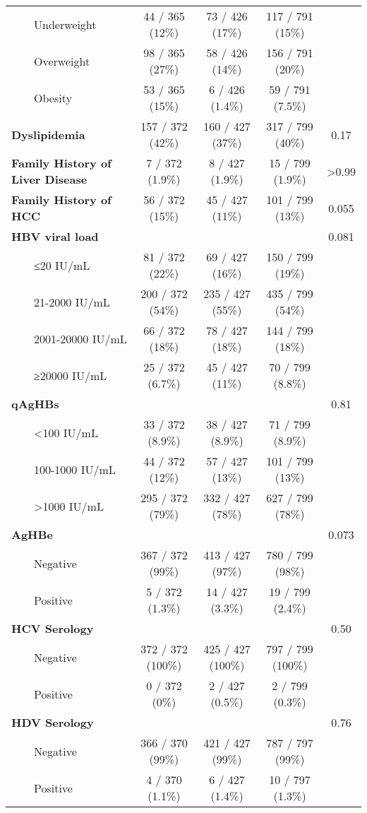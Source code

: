 \documentclass[
]{article}
\begin{document}
\begin{longtable}{lcccc}
    Underweight & 44 / 365 (12\%) & 73 / 426 (17\%) & 117 / 791 (15\%) &  \\ 
    Overweight & 98 / 365 (27\%) & 58 / 426 (14\%) & 156 / 791 (20\%) &  \\ 
    Obesity & 53 / 365 (15\%) & 6 / 426 (1.4\%) & 59 / 791 (7.5\%) &  \\ 
\textbf{Dyslipidemia} & 157 / 372 (42\%) & 160 / 427 (37\%) & 317 / 799 (40\%) & 0.17 \\ 
\textbf{Family History of Liver Disease} & 7 / 372 (1.9\%) & 8 / 427 (1.9\%) & 15 / 799 (1.9\%) & >0.99 \\ 
\textbf{Family History of HCC} & 56 / 372 (15\%) & 45 / 427 (11\%) & 101 / 799 (13\%) & 0.055 \\ 
\textbf{HBV viral load} &  &  &  & 0.081 \\ 
    ≤20 IU/mL & 81 / 372 (22\%) & 69 / 427 (16\%) & 150 / 799 (19\%) &  \\ 
    21-2000 IU/mL & 200 / 372 (54\%) & 235 / 427 (55\%) & 435 / 799 (54\%) &  \\ 
    2001-20000 IU/mL & 66 / 372 (18\%) & 78 / 427 (18\%) & 144 / 799 (18\%) &  \\ 
    ≥20000 IU/mL & 25 / 372 (6.7\%) & 45 / 427 (11\%) & 70 / 799 (8.8\%) &  \\ 
\textbf{qAgHBs} &  &  &  & 0.81 \\ 
    <100 IU/mL & 33 / 372 (8.9\%) & 38 / 427 (8.9\%) & 71 / 799 (8.9\%) &  \\ 
    100-1000 IU/mL & 44 / 372 (12\%) & 57 / 427 (13\%) & 101 / 799 (13\%) &  \\ 
    >1000 IU/mL & 295 / 372 (79\%) & 332 / 427 (78\%) & 627 / 799 (78\%) &  \\ 
\textbf{AgHBe} &  &  &  & 0.073 \\ 
    Negative & 367 / 372 (99\%) & 413 / 427 (97\%) & 780 / 799 (98\%) &  \\ 
    Positive & 5 / 372 (1.3\%) & 14 / 427 (3.3\%) & 19 / 799 (2.4\%) &  \\ 
\textbf{HCV Serology} &  &  &  & 0.50 \\ 
    Negative & 372 / 372 (100\%) & 425 / 427 (100\%) & 797 / 799 (100\%) &  \\ 
    Positive & 0 / 372 (0\%) & 2 / 427 (0.5\%) & 2 / 799 (0.3\%) &  \\ 
\textbf{HDV Serology} &  &  &  & 0.76 \\ 
    Negative & 366 / 370 (99\%) & 421 / 427 (99\%) & 787 / 797 (99\%) &  \\ 
    Positive & 4 / 370 (1.1\%) & 6 / 427 (1.4\%) & 10 / 797 (1.3\%) &  \\ 

\end{longtable}
\end{document}
